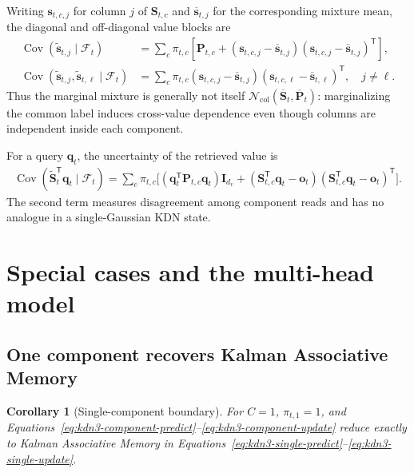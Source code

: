 \documentclass[11pt]{article}
\newcommand{\ve}[1]{\boldsymbol{#1}}
\newcommand{\tr}{\mathsf{T}}
\newcommand{\Cov}{\operatorname{Cov}}
\newcommand{\Normal}{\mathcal{N}}
\newtheorem{corollary}{Corollary}
\begin{document}
Writing $\ve{s}_{t,c,j}$ for column $j$ of $\ve{S}_{t,c}$ and
$\overline{\ve{s}}_{t,j}$ for the corresponding mixture mean, the diagonal and off-diagonal value
blocks are
\begin{equation}
\begin{aligned}
  \Cov(\widetilde{\ve{s}}_{t,j}\mid\mathcal{F}_t)
  &=\sum_c\pi_{t,c}\left[
      \ve{P}_{t,c}
      +(\ve{s}_{t,c,j}-\overline{\ve{s}}_{t,j})
       (\ve{s}_{t,c,j}-\overline{\ve{s}}_{t,j})^{\tr}
    \right],
  \\
  \Cov(\widetilde{\ve{s}}_{t,j},\widetilde{\ve{s}}_{t,\ell}\mid\mathcal{F}_t)
  &=\sum_c\pi_{t,c}
    (\ve{s}_{t,c,j}-\overline{\ve{s}}_{t,j})
    (\ve{s}_{t,c,\ell}-\overline{\ve{s}}_{t,\ell})^{\tr},
  \quad j\ne\ell.
\end{aligned}
  \label{eq:kdn3-column-covariance}
\end{equation}
Thus the marginal mixture is generally not itself
$\Normal_{\mathrm{col}}(\overline{\ve{S}}_t,\overline{\ve{P}}_t)$: marginalizing the common label
induces cross-value dependence even though columns are independent inside each component.

For a query $\ve{q}_t$, the uncertainty of the retrieved value is
\begin{equation}
\begin{aligned}
  \Cov(\widetilde{\ve{S}}_t^{\tr}\ve{q}_t\mid\mathcal{F}_t)
  =\sum_c\pi_{t,c}\Big[
    (\ve{q}_t^{\tr}\ve{P}_{t,c}\ve{q}_t)\ve{I}_{d_v}
    +(\ve{S}_{t,c}^{\tr}\ve{q}_t-\ve{o}_t)
     (\ve{S}_{t,c}^{\tr}\ve{q}_t-\ve{o}_t)^{\tr}
  \Big].
  \label{eq:kdn3-read-covariance}
\end{aligned}
\end{equation}
The second term measures disagreement among component reads and has no analogue in a
single-Gaussian KDN state.

\section{Special cases and the multi-head model}
\label{sec:kdn3-special-cases}

\subsection{One component recovers Kalman Associative Memory}

\begin{corollary}[Single-component boundary]
\label{cor:kdn3-single-component}
For $C=1$, $\pi_{t,1}=1$, and
Equations~\eqref{eq:kdn3-component-predict}--\eqref{eq:kdn3-component-update} reduce exactly to
Kalman Associative Memory in
Equations~\eqref{eq:kdn3-single-predict}--\eqref{eq:kdn3-single-update}.
\end{corollary}
\end{document}
